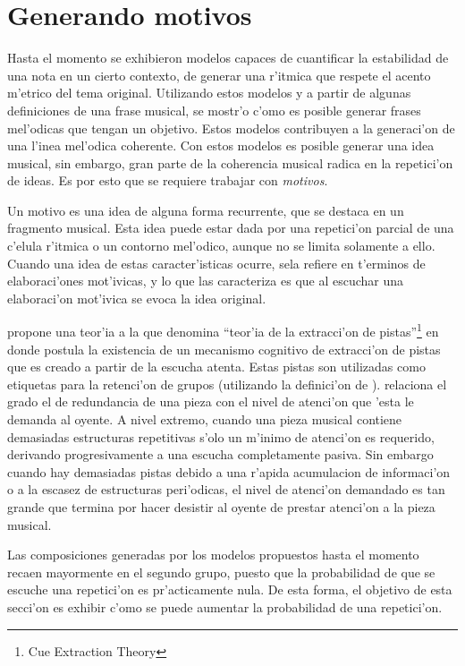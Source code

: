 \section{Generando motivos}
Hasta el momento se exhibieron modelos capaces de cuantificar la estabilidad de una nota en un cierto contexto, de generar una r'itmica que
respete el acento m'etrico del tema original. Utilizando estos modelos y a partir de algunas definiciones de una frase musical, se mostr'o c'omo es posible
generar frases mel'odicas que tengan un objetivo. Estos modelos contribuyen a la generaci'on de una l'inea mel'odica coherente. Con estos modelos es posible
generar una idea musical, sin embargo, gran parte de la coherencia musical radica en la repetici'on de ideas. Es por esto que se requiere trabajar con \emph{motivos}. 

Un motivo es una idea de alguna forma recurrente, que se destaca en un fragmento musical. Esta idea puede estar dada por una repetici'on parcial de una c'elula 
r'itmica o un contorno mel'odico, aunque no se limita solamente a ello. Cuando una idea de estas caracter'isticas ocurre, sela refiere en t'erminos
de elaboraci'ones mot'ivicas, y lo que las caracteriza es que al escuchar una elaboraci'on mot'ivica se evoca la idea original.

\cite{Deliege87} propone una teor'ia a la que denomina ``teor'ia de la extracci'on de pistas''\footnote{Cue Extraction Theory} en donde postula la existencia de un mecanismo cognitivo de 
extracci'on de pistas 
que es creado a partir de la escucha atenta. Estas pistas son utilizadas como etiquetas para la retenci'on de grupos (utilizando la definici'on de 
\cite{LerdahlJackendoff83}). \cite{Deliege90} relaciona el grado el
de redundancia de una pieza con el nivel de atenci'on que 'esta le demanda al oyente. A nivel extremo, cuando una pieza musical contiene demasiadas estructuras 
repetitivas s'olo un m'inimo de atenci'on es requerido, derivando progresivamente a una escucha completamente pasiva. Sin embargo cuando hay demasiadas 
pistas debido a una r'apida acumulacion de informaci'on o a la escasez de estructuras peri'odicas, el nivel de atenci'on demandado es tan grande que 
termina por hacer desistir al oyente de prestar atenci'on a la pieza musical.

Las composiciones generadas por los modelos propuestos hasta el momento recaen mayormente en el segundo grupo, puesto que la probabilidad de que se escuche
una repetici'on es pr'acticamente nula. De esta forma, el objetivo de esta secci'on es exhibir c'omo se puede aumentar la probabilidad de una repetici'on.



